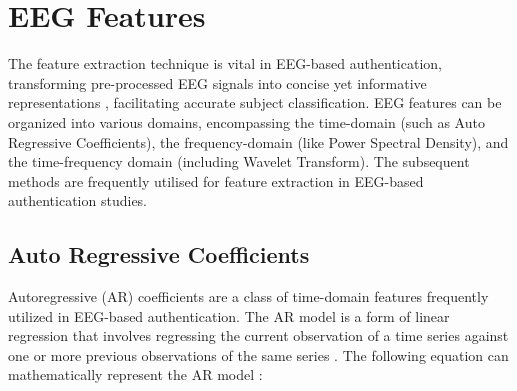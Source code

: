 
\section{EEG Features}
\label{sec:Background:EEG Features}
The feature extraction technique is vital in EEG-based authentication, transforming pre-processed EEG signals into concise yet informative representations \cite{azlan2014feature}, facilitating accurate subject classification. EEG features can be organized into various domains, encompassing the time-domain (such as Auto Regressive Coefficients), the frequency-domain (like Power Spectral Density), and the time-frequency domain (including Wavelet Transform). The subsequent methods are frequently utilised for feature extraction in EEG-based authentication studies. 

\subsection{Auto Regressive Coefficients}
Autoregressive (AR) coefficients are a class of time-domain features frequently utilized in EEG-based authentication. %
The AR model is a form of linear regression that involves regressing the current observation of a time series against one or more previous observations of the same series \cite{zhang2017classification}.
The following equation can mathematically represent the AR model \cite{survey_brain_biometrics}: 

